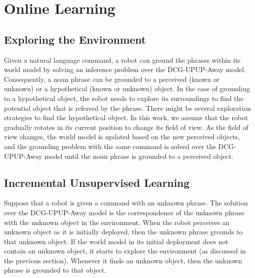 \section{Online Learning}
\label{sec:implementation}
\subsection{Exploring the Environment}
Given a natural language command, a robot can ground the phrases within its world model by solving an inference problem over the DCG-UPUP-Away model. Consequently, a noun phrase can be grounded to a perceived (known or unknown) or a hypothetical (known or unknown) object. In the case of grounding to a hypothetical object, the robot needs to explore its surroundings to find the potential object that is referred by the phrase. There might be several exploration strategies to find the hypothetical object. In this work, we assume that the robot gradually rotates in its current position to change its field of view. As the field of view changes, the world model is updated based on the new perceived objects, and the grounding problem with the same command is solved over the DCG-UPUP-Away model until the noun phrase is grounded to a perceived object.   


\subsection{Incremental Unsupervised Learning}
Suppose that a robot is given a command with an unknown phrase. The solution over the DCG-UPUP-Away model is the correspondence of the unknown phrase with the unknown object in the environment. When the robot perceives an unknown object as it is initially deployed, then the unknown phrase grounds to that unknown object. If the world model in its initial deployment does not contain an unknown object, it starts to explore the environment (as discussed in the previous section). Whenever it finds an unknown object, then the unknown phrase is grounded to that object. 

